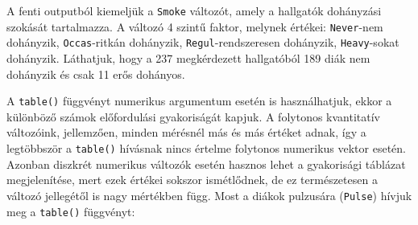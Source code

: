 \documentclass[
]{book}
\newenvironment{Shaded}{\begin{snugshade}}{\end{snugshade}}
\newcommand{\AttributeTok}[1]{\textcolor[rgb]{0.77,0.63,0.00}{#1}}
\newcommand{\CommentTok}[1]{\textcolor[rgb]{0.56,0.35,0.01}{\textit{#1}}}
\newcommand{\FunctionTok}[1]{\textcolor[rgb]{0.00,0.00,0.00}{#1}}
\newcommand{\NormalTok}[1]{#1}
\newcommand{\SpecialCharTok}[1]{\textcolor[rgb]{0.00,0.00,0.00}{#1}}
\newcommand{\StringTok}[1]{\textcolor[rgb]{0.31,0.60,0.02}{#1}}
\begin{document}
A fenti outputból kiemeljük a \texttt{Smoke} változót, amely a hallgatók dohányzási szokását tartalmazza. A változó 4 szintű faktor, melynek értékei: \texttt{Never}-nem dohányzik, \texttt{Occas}-ritkán dohányzik, \texttt{Regul}-rendszeresen dohányzik, \texttt{Heavy}-sokat dohányzik. Láthatjuk, hogy a 237 megkérdezett hallgatóból 189 diák nem dohányzik és csak 11 erős dohányos.

A \texttt{table()} függvényt numerikus argumentum esetén is használhatjuk, ekkor a különböző számok előfordulási gyakoriságát kapjuk. A folytonos kvantitatív változóink, jellemzően, minden mérésnél más és más értéket adnak, így a legtöbbször a \texttt{table()} hívásnak nincs értelme folytonos numerikus vektor esetén. Azonban diszkrét numerikus változók esetén hasznos lehet a gyakorisági táblázat megjelenítése, mert ezek értékei sokszor ismétlődnek, de ez természetesen a változó jellegétől is nagy mértékben függ. Most a diákok pulzusára (\texttt{Pulse}) hívjuk meg a \texttt{table()} függvényt:

\begin{Shaded}
\end{Shaded}
\end{document}
